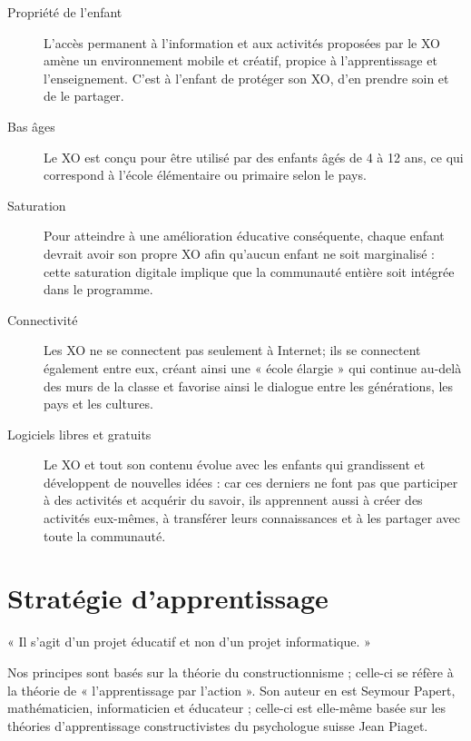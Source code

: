 \documentclass[11pt]{article}
\begin{document}
\begin{description}
\item[Propriété de l'enfant] L'accès permanent à l'information et aux
     activités proposées par le XO amène un environnement mobile et
     créatif, propice à l'apprentissage et l'enseignement. C'est à l'enfant
     de protéger son XO, d'en prendre soin et de le partager.
\item[Bas âges] Le XO est conçu pour être utilisé par des enfants âgés de 4 à
              12 ans, ce qui correspond à l'école élémentaire ou primaire
              selon le pays.
\item[Saturation] Pour atteindre à une amélioration éducative conséquente,
                chaque enfant devrait avoir son propre XO afin qu'aucun
                enfant ne soit marginalisé : cette saturation digitale
                implique que la communauté entière soit intégrée dans le
                programme.
\item[Connectivité] Les XO ne se connectent pas seulement à Internet; ils se
                  connectent également entre eux, créant ainsi une « école
                  élargie » qui continue au-delà des murs de la classe et
                  favorise ainsi le dialogue entre les générations, les
                  pays et les cultures.
\item[Logiciels libres et gratuits] Le XO et tout son contenu évolue avec les
     enfants qui grandissent et développent de nouvelles idées : car ces
     derniers ne font pas que participer à des activités et acquérir du
     savoir, ils apprennent aussi à créer des activités eux-mêmes, à
     transférer leurs connaissances et à les partager avec toute la
     communauté.
\end{description}
\section{Stratégie d'apprentissage}
\label{sec-2}



« Il s'agit d'un projet éducatif et non d'un projet informatique. »

Nos principes sont basés sur la théorie du constructionnisme ; celle-ci se
réfère à la théorie de « l'apprentissage par l'action ». Son auteur en est
Seymour Papert, mathématicien, informaticien et éducateur ; celle-ci est
elle-même basée sur les théories d'apprentissage constructivistes du
psychologue suisse Jean Piaget.
\end{document}
